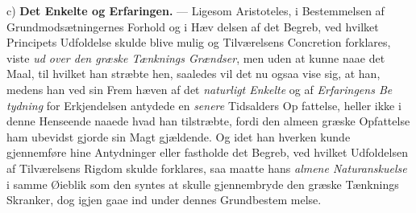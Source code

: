 c) \textbf{Det Enkelte og Erfaringen.} --- Ligesom Aristoteles, i
Bestemmelsen af Grundmodsætningernes Forhold og i Hæv\-%
delsen af det Begreb, ved hvilket Principets Udfoldelse skulde
blive mulig og Tilværelsens Concretion forklares, viste \emph{ud
over den græske Tænknings Grændser}, men uden at
kunne naae det Maal, til hvilket han stræbte hen, saaledes
vil det nu ogsaa vise sig, at han, medens han ved sin Frem\-%
hæven af det \emph{naturligt Enkelte} og af \emph{Erfaringens Be\-%
tydning} for Erkjendelsen antydede en \emph{senere} Tidsalders Op\-%
fattelse, heller ikke i denne Henseende naaede hvad han
tilstræbte, fordi den almeen græske Opfattelse ham ubevidst
gjorde sin Magt gjældende. Og idet han hverken kunde
gjennemføre hine Antydninger eller fastholde det Begreb, ved
hvilket Udfoldelsen af Tilværelsens Rigdom skulde forklares,
saa maatte hans \emph{almene Naturanskuelse} i samme Øieblik
som den syntes at skulle gjennembryde den græske Tænknings
Skranker, dog igjen gaae ind under dennes Grundbestem\-%
melse.


